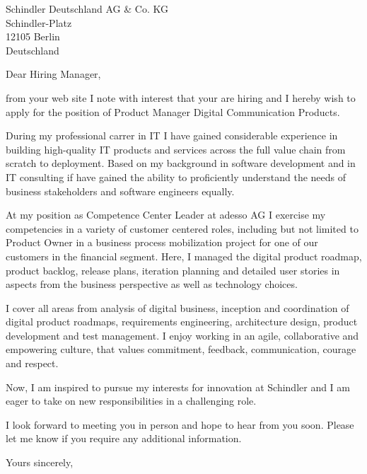 \documentclass[10pt,a4paper]{dinbrief}
\date{\today}
\begin{document}
 
\begin{letter}  
{%
	Schindler Deutschland AG \& Co. KG\\
	Schindler-Platz\\
	12105 Berlin\\
	Deutschland
}
\subject{\bf Job Application Product Manager}
\opening{Dear Hiring Manager,}

from your web site I note with interest that your are hiring and I hereby wish to apply for the position of Product Manager Digital Communication Products. 

During my professional carrer in IT I have gained considerable experience in building high-quality IT products and services across the full value chain from scratch to deployment. Based on my background in software development and in IT consulting if have gained the ability to proficiently understand the needs of business stakeholders and software engineers equally. 

At my position as Competence Center Leader at adesso AG I exercise my competencies in a variety of customer centered roles, including but not limited to Product Owner in a business process mobilization project for one of our customers in the financial segment. Here, I managed the digital product roadmap, product backlog, release plans, iteration planning and detailed user stories in aspects from the business perspective as well as technology choices. 

I cover all areas from analysis of digital business, inception and coordination of digital product roadmaps, requirements engineering,  architecture design, product development and test management. %
I enjoy working in an agile, collaborative and empowering culture, that values commitment, feedback, communication, courage and respect. 


Now, I am inspired to pursue my interests for innovation at Schindler and I am eager to take on new responsibilities in a challenging role.

I look forward to meeting you in person and hope to hear from you soon. Please let me know if you require any additional information.

\closing{Yours sincerely,}
\end{letter}
\end{document}
